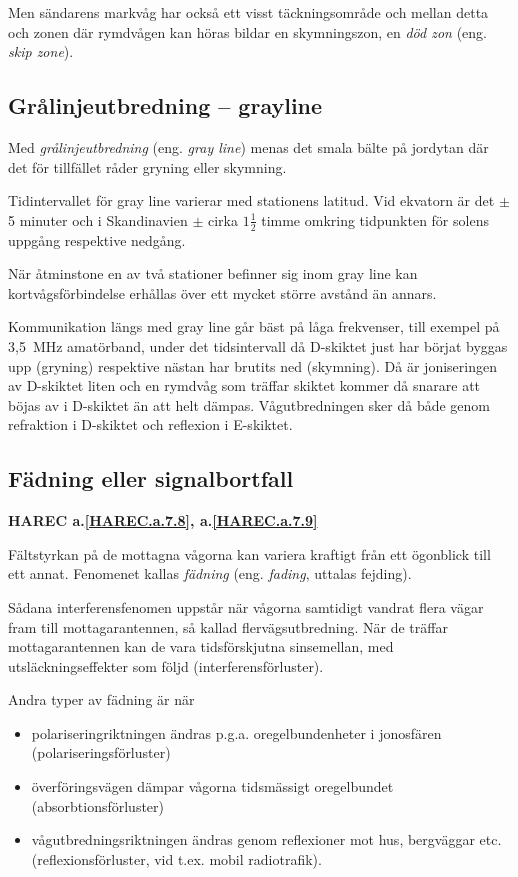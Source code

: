 Men sändarens markvåg har också ett visst täckningsområde och mellan
detta och zonen där rymdvågen kan höras bildar en skymningszon, en
\emph{död zon} (eng. \emph{skip zone}).

\subsection{Grålinjeutbredning -- grayline}

Med \emph{grålinjeutbredning} (eng. \emph{gray line}) menas det smala bälte på
jordytan där det för tillfället råder gryning eller skymning.

Tidintervallet för gray line varierar med stationens latitud.
Vid ekvatorn är det \(\pm\) 5 minuter och i Skandinavien \(\pm\) cirka
\(1\frac{1}{2}\) timme omkring tidpunkten för solens uppgång
respektive nedgång.

När åtminstone en av två stationer befinner sig inom gray line kan
kortvågsförbindelse erhållas över ett mycket större avstånd än annars.

Kommunikation längs med gray line går bäst på låga frekvenser,
till exempel på 3,5~MHz amatörband, under det tidsintervall då D-skiktet just
har börjat byggas upp (gryning) respektive nästan har brutits ned (skymning).
Då är joniseringen av D-skiktet liten och en rymdvåg som
träffar skiktet kommer då snarare att böjas av i D-skiktet än att helt dämpas.
Vågutbredningen sker då både genom refraktion i D-skiktet och reflexion i
E-skiktet.

\subsection{Fädning eller signalbortfall}
\textbf{
HAREC a.\ref{HAREC.a.7.8}\label{myHAREC.a.7.8},
 a.\ref{HAREC.a.7.9}\label{myHAREC.a.7.9}
}

Fältstyrkan på de mottagna vågorna kan variera kraftigt från ett ögonblick till
ett annat.
Fenomenet kallas \emph{fädning} (eng. \emph{fading}, uttalas fejding).

Sådana interferensfenomen uppstår när vågorna samtidigt vandrat flera
vägar fram till mottagarantennen, så kallad flervägsutbredning.
När de träffar mottagarantennen kan de vara tidsförskjutna sinsemellan, med
utsläckningseffekter som följd (interferensförluster).

Andra typer av fädning är när
\begin{itemize}
\item polariseringriktningen ändras p.g.a. oregelbundenheter i
  jonosfären (polariseringsförluster)
\item överföringsvägen dämpar vågorna tidsmässigt oregelbundet
  (absorbtionsförluster)
\item vågutbredningsriktningen ändras genom reflexioner mot hus,
  bergväggar etc. (reflexionsförluster, vid t.ex. mobil radiotrafik).
\end{itemize}

